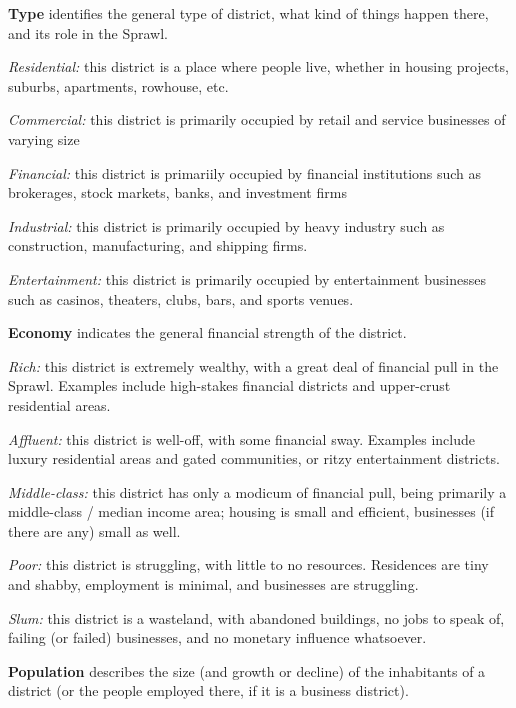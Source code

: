 \documentclass[oneside,10pt]{article}
\begin{document}
\begin{multicols}{2}
\textbf{Type} identifies the general type of district, what kind of things
happen there, and its role in the Sprawl.
\begin{adjustwidth*}{.5cm}{.5cm}

\textit{Residential:} this district is a place where people live,
whether in housing projects, suburbs, apartments, rowhouse, etc.

\textit{Commercial:} this district is primarily occupied by retail and
service businesses of varying size

\textit{Financial:} this district is primariily occupied by financial institutions such as brokerages, stock markets, banks, and
investment firms

\textit{Industrial:} this district is primarily occupied by heavy industry such as construction, manufacturing, and shipping
firms.

\textit{Entertainment:} this district is primarily occupied by entertainment businesses such as casinos, theaters, clubs, bars,
and sports venues.
\end{adjustwidth*}

\textbf{Economy} indicates the general financial strength of the district.
\begin{adjustwidth*}{.5cm}{.5cm}

\textit{Rich:} this district is extremely wealthy, with a great deal of
financial pull in the Sprawl. Examples include high-stakes
financial districts and upper-crust residential areas.

\textit{Affluent:} this district is well-off, with some financial sway.
Examples include luxury residential areas and gated communities, or ritzy entertainment districts.

\textit{Middle-class:} this district has only a modicum of financial
pull, being primarily a middle-class / median income area;
housing is small and efficient, businesses (if there are any)
small as well.

\textit{Poor:} this district is struggling, with little to no resources.
Residences are tiny and shabby, employment is minimal,
and businesses are struggling.

\textit{Slum:} this district is a wasteland, with abandoned buildings, no jobs to speak of, failing (or failed) businesses, and
no monetary influence whatsoever.
\end{adjustwidth*}

\textbf{Population} describes the size (and growth or decline) of the
inhabitants of a district (or the people employed there, if it is
a business district).
\begin{adjustwidth*}{.5cm}{.5cm}


\end{adjustwidth*}
\end{multicols}
\end{document}
